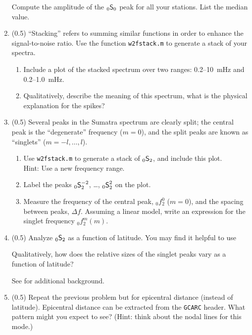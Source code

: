 \documentclass[11pt,titlepage,fleqn]{article}
\newcommand{\snl}[2]{\mbox{$_{#1}\ssS_{#2}$}}
\newcommand{\snlm}[3]{\mbox{$_{#1}\ssS_{#2}^{#3}$}}
\begin{document}
\begin{enumerate}
Compute the amplitude of the \snl{0}{0} peak for all your stations. List the median value.


\item (0.5) ``Stacking'' refers to summing similar functions in order to enhance the signal-to-noise ratio. Use the function \verb+w2fstack.m+ to generate a stack of your spectra.
%
\begin{enumerate}
\item Include a plot of the stacked spectrum over two ranges: 0.2--10~mHz and 0.2--1.0~mHz.
\item Qualitatively, describe the meaning of this spectrum, \eg what is the physical explanation for the spikes?
\end{enumerate}
%


\item (0.5) Several peaks in the Sumatra spectrum are clearly split; the central peak is the ``degenerate'' frequency ($m=0$), and the split peaks are known as ``singlets'' ($m = -l,\ldots,l$). 
%
\begin{enumerate}
\item Use \verb+w2fstack.m+ to generate a stack of \snl{0}{2}, and include this plot. \\
Hint: Use a new frequency range.
\item Label the peaks \snlm{0}{2}{-2}, \ldots, \snlm{0}{2}{2} on the plot.
\item Measure the frequency of the central peak, $_0f_2^0$ ($m=0$), and the spacing between peaks, $\Delta f$.
Assuming a linear model, write an expression for the singlet frequency $_0f_2^m(m)$.
\end{enumerate}


\item (0.5) Analyze \snl{0}{2} as a function of latitude. You may find it helpful to use 

Qualitatively, how does the relative sizes of the singlet peaks vary as a function of latitude?

See \citet[][Figure 3]{SSteinOkal2007} for additional background.


\item (0.5) Repeat the previous problem but for epicentral distance (instead of latitude). Epicentral distance can be extracted from the \verb+GCARC+ header. What pattern might you expect to see? (Hint: think about the nodal lines for this mode.)


\end{enumerate}
\end{document}
